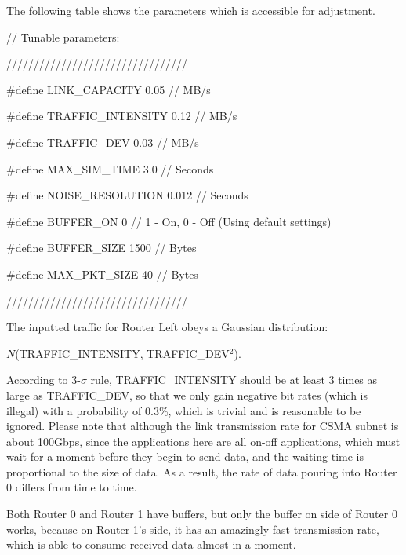 \documentclass[a4paper]{article}
\begin{document}
The following table shows the parameters which is accessible for adjustment.
\newline

// Tunable parameters:

/////////////////////////////////

\#define LINK\_CAPACITY 0.05      // MB/s

\#define TRAFFIC\_INTENSITY 0.12  // MB/s

\#define TRAFFIC\_DEV 0.03        // MB/s

\#define MAX\_SIM\_TIME 3.0        // Seconds

\#define NOISE\_RESOLUTION 0.012  // Seconds

\#define BUFFER\_ON 0             // 1 - On, 0 - Off (Using default settings)

\#define BUFFER\_SIZE 1500        // Bytes

\#define MAX\_PKT\_SIZE 40         // Bytes

/////////////////////////////////
\newline


The inputted traffic for Router Left obeys a Gaussian distribution:

$N$(TRAFFIC\_INTENSITY, TRAFFIC\_DEV{$^2$}).

According to 3-$\sigma$ rule, TRAFFIC\_INTENSITY should be at least 3 times as large as TRAFFIC\_DEV, so that we only gain negative bit rates (which is illegal) with a probability of 0.3\%, which is trivial and is reasonable to be ignored. Please note that although the link transmission rate for CSMA subnet is about 100Gbps, since the applications here are all on-off applications, which must wait for a moment before they begin to send data, and the waiting time is proportional to the size of data. As a result, the rate of data pouring into Router 0 differs from time to time.

Both Router 0 and Router 1 have buffers, but only the buffer on side of Router 0 works, because on Router 1's side, it has an amazingly fast transmission rate, which is able to consume received data almost in a moment.
\end{document}
